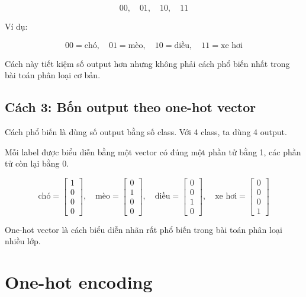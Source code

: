 \[
    00,\quad 01,\quad 10,\quad 11
\]

Ví dụ:

\[
    00 = \text{chó}, \quad
    01 = \text{mèo}, \quad
    10 = \text{diều}, \quad
    11 = \text{xe hơi}
\]

Cách này tiết kiệm số output hơn nhưng không phải cách phổ biến nhất trong bài toán phân loại cơ bản.

\subsection{Cách 3: Bốn output theo one-hot vector}

Cách phổ biến là dùng số output bằng số class. Với 4 class, ta dùng 4 output.

Mỗi label được biểu diễn bằng một vector có đúng một phần tử bằng 1, các phần tử còn lại bằng 0.

\[
    \text{chó} =
    \begin{bmatrix}
    1\\0\\0\\0
    \end{bmatrix},
    \quad
    \text{mèo} =
    \begin{bmatrix}
    0\\1\\0\\0
    \end{bmatrix},
    \quad
    \text{diều} =
    \begin{bmatrix}
    0\\0\\1\\0
    \end{bmatrix},
    \quad
    \text{xe hơi} =
    \begin{bmatrix}
    0\\0\\0\\1
    \end{bmatrix}
\]

\begin{ghinho}
One-hot vector là cách biểu diễn nhãn rất phổ biến trong bài toán phân loại nhiều lớp.
\end{ghinho}

\section{One-hot encoding}

